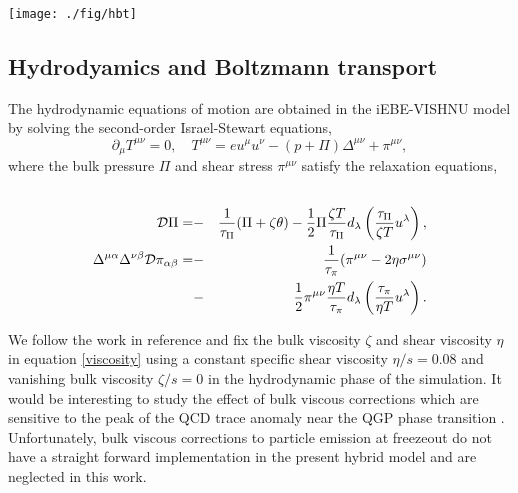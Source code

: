 \documentclass[aps,prc,reprint,amsmath,nofootinbib,superscriptaddress]{revtex4-1}
\newcommand{\hotqcd}{HQCD~}
\newcommand{\wb}{WB~}
\newcommand{\spv}{S95~}
\begin{document}
\begin{figure*}[t]
  \texttt{[image: ./fig/hbt]}
  \caption{
    \label{fig:hbt} Effect of the equation of state on the Bertsch-Pratt radii.  We plot $R_s$, $R_o$, $R_l$ and the ratio $R_o/R_s$ (rows top to bottom) 
    in centrality bins $0$--$10\%$, $20$--$30\%$ and $40$--$50\%$ (columns left to right) against transverse mass $m_T$ for the \hotqcd, \wb  and \spv equations of state 
    (purple, orange and blue lines). Shaded bands indicate two sigma errors estimated from the Jacobian of the fit function \eqref{fitfunction}. Symbols with errors bars 
    are experimental data from PHENIX.  
  }
\end{figure*}


\subsection{Hydrodyamics and Boltzmann transport}

The hydrodynamic equations of motion are obtained in the iEBE-VISHNU model by solving the second-order Israel-Stewart equations,
\begin{equation}
 \partial_\mu T^{\mu\nu} = 0, \quad T^{\mu\nu} = e u^\mu u^\nu - (p + \Pi) \Delta^{\mu\nu} + \pi^{\mu\nu},
\end{equation}
where the bulk pressure $\Pi$ and shear stress $\pi^{\mu\nu}$ satisfy the relaxation equations,
\begin{eqnarray}
 \label{viscosity}
 \cr \mathcal{D}\Pi = &-&\frac{1}{\tau_\Pi}(\Pi + \zeta \theta) - \frac{1}{2} \Pi \frac{\zeta T}{\tau_\Pi}d_\lambda \left(\frac{\tau_\Pi}{\zeta T} u^\lambda \right), \nonumber \\
  \Delta^{\mu\alpha} \Delta^{\nu\beta} \mathcal{D}\pi_{\alpha\beta} = &-&\frac{1}{\tau_\pi}(\pi^{\mu\nu} - 2 \eta \sigma^{\mu\nu}) \\
  &-& \frac{1}{2} \pi^{\mu\nu} \frac{\eta T}{\tau_\pi} d_\lambda\left(\frac{\tau_\pi}{\eta T} u^\lambda \right ).
\end{eqnarray}

We follow the work in reference \cite{Shen:2014sfi} and fix the bulk viscosity $\zeta$ and shear viscosity $\eta$ in equation \eqref{viscosity} using a constant specific shear viscosity $\eta/s=0.08$ 
and vanishing bulk viscosity $\zeta/s=0$ in the hydrodynamic phase of the simulation. It would be interesting to study the effect of bulk viscous corrections which are sensitive to 
the peak of the QCD trace anomaly near the QGP phase transition \cite{Karsch:2007jc}. Unfortunately, bulk viscous corrections to particle emission at freezeout do not have a straight forward implementation in the present hybrid model 
and are neglected in this work. 
\end{document}
